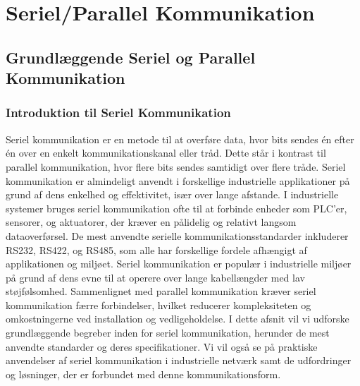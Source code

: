 \part{Seriel/Parallel Kommunikation}
\chapter{Grundlæggende Seriel og Parallel Kommunikation}
\section{Introduktion til Seriel Kommunikation}
Seriel kommunikation er en metode til at overføre data, hvor bits sendes én efter én over en enkelt kommunikationskanal eller tråd. Dette står i kontrast til parallel kommunikation, hvor flere bits sendes samtidigt over flere tråde. Seriel kommunikation er almindeligt anvendt i forskellige industrielle applikationer på grund af dens enkelhed og effektivitet, især over lange afstande.
\newline\newline\noindent
I industrielle systemer bruges seriel kommunikation ofte til at forbinde enheder som PLC'er, sensorer, og aktuatorer, der kræver en pålidelig og relativt langsom dataoverførsel. De mest anvendte serielle kommunikationsstandarder inkluderer RS232, RS422, og RS485, som alle har forskellige fordele afhængigt af applikationen og miljøet.
\newline\newline\noindent
Seriel kommunikation er populær i industrielle miljøer på grund af dens evne til at operere over lange kabellængder med lav støjfølsomhed. Sammenlignet med parallel kommunikation kræver seriel kommunikation færre forbindelser, hvilket reducerer kompleksiteten og omkostningerne ved installation og vedligeholdelse.
\newline\newline\noindent
I dette afsnit vil vi udforske grundlæggende begreber inden for seriel kommunikation, herunder de mest anvendte standarder og deres specifikationer. Vi vil også se på praktiske anvendelser af seriel kommunikation i industrielle netværk samt de udfordringer og løsninger, der er forbundet med denne kommunikationsform.

